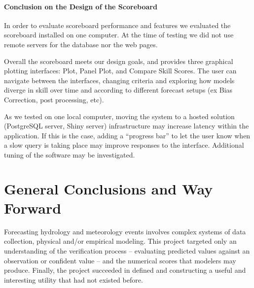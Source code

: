 \documentclass[logos,parttoc,morelanguage=french,morelanguage=german]{orsay-memoire}
\begin{document}
%


\subsection{Conclusion on the Design of the Scoreboard}

In order to evaluate scoreboard performance and features we evaluated the scoreboard installed on one computer. At the time of testing we did not use remote servers for the database nor the web pages.

Overall the scoreboard meets our design goals, and provides three graphical plotting interfaces: Plot, Panel Plot, and Compare Skill Scores. The user can navigate between the interfaces, changing criteria and exploring how models diverge in skill over time and according to different forecast setups (ex Bias Correction, post processing, etc).

As we tested on one local computer, moving the system to a hosted solution (PostgreSQL server, Shiny server) infrastructure may increase latency within the application. If this is the case, adding a ``progress bar'' to let the user know when a slow query is taking place may improve responses to the interface. Additional tuning of the software may be investigated.


\strut\newpage


\part{General Conclusions and Way Forward}

Forecasting hydrology and meteorology events involves complex systems of data collection, physical and/or empirical modeling. This project targeted only an understanding of the verification process -- evaluating predicted values against an observation or confident value -- and the numerical scores that modelers may produce. Finally, the project succeeded in defined and constructing a useful and interesting utility that had not existed before.
\end{document}
